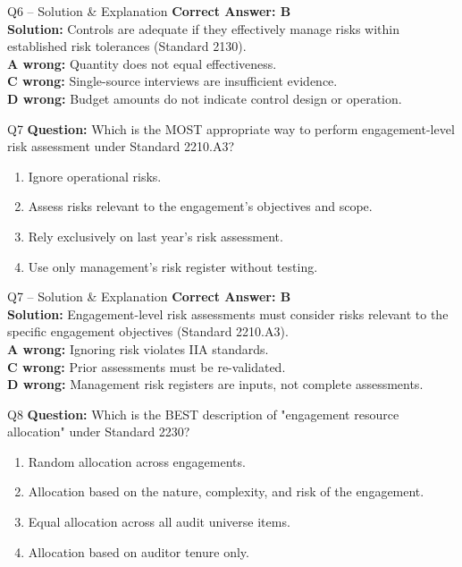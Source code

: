 \documentclass[aspectratio=169,10pt]{beamer}
\begin{document}
	\begin{frame}[t]{Q6 -- Solution \& Explanation}
		\small
		\textbf{Correct Answer: B} \\[4pt]
		\textbf{Solution:} Controls are adequate if they effectively manage risks within established risk tolerances (Standard 2130). \\[4pt]
		\textbf{A wrong:} Quantity does not equal effectiveness. \\[2pt]
		\textbf{C wrong:} Single-source interviews are insufficient evidence. \\[2pt]
		\textbf{D wrong:} Budget amounts do not indicate control design or operation.
	\end{frame}
	
	\begin{frame}[t]{Q7}
		\small
		\textbf{Question:} Which is the MOST appropriate way to perform engagement-level risk assessment under Standard 2210.A3?
		\begin{enumerate}[label=\Alph*.,itemsep=1pt,topsep=2pt]
			\item Ignore operational risks.
			\item Assess risks relevant to the engagement's objectives and scope.
			\item Rely exclusively on last year's risk assessment.
			\item Use only management's risk register without testing.
		\end{enumerate}
	\end{frame}
	
	\begin{frame}[t]{Q7 -- Solution \& Explanation}
		\small
		\textbf{Correct Answer: B} \\[4pt]
		\textbf{Solution:} Engagement-level risk assessments must consider risks relevant to the specific engagement objectives (Standard 2210.A3). \\[4pt]
		\textbf{A wrong:} Ignoring risk violates IIA standards. \\[2pt]
		\textbf{C wrong:} Prior assessments must be re-validated. \\[2pt]
		\textbf{D wrong:} Management risk registers are inputs, not complete assessments.
	\end{frame}
	
	\begin{frame}[t]{Q8}
		\small
		\textbf{Question:} Which is the BEST description of "engagement resource allocation" under Standard 2230?
		\begin{enumerate}[label=\Alph*.,itemsep=1pt,topsep=2pt]
			\item Random allocation across engagements.
			\item Allocation based on the nature, complexity, and risk of the engagement.
			\item Equal allocation across all audit universe items.
			\item Allocation based on auditor tenure only.
		\end{enumerate}
	\end{frame}
	
\end{document}

